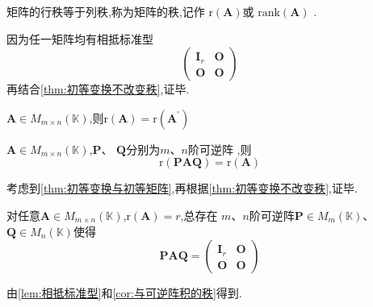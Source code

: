 \begin{formal}
\begin{theorem}[行列秩关系]
    矩阵的行秩等于列秩,称为矩阵的秩,记作
    $\mathrm{r}\left(\bm{A}\right)$或
    $\mathrm{rank}\left(\bm{A}\right)$
    .
\end{theorem}
\begin{Proof}
因为任一矩阵均有相抵标准型
\[
\begin{pmatrix}
    \bm{I}_r & \bm{O} \\
    \bm{O} & \bm{O} 
\end{pmatrix}
\]再结合\cref{thm:初等变换不改变秩},证毕.
\end{Proof}
\end{formal}
\begin{green}
\begin{corollary}[转置的秩]\label{cor:转置的秩}
    $\bm{A} \in 
    M_{m \times n}\left(
        \mathbb{K}
    \right)$,则$\mathrm{r}\left(
        \bm{A}\right) = \mathrm{r}
        \left(\bm{A}^{\prime}\right)$
\end{corollary}
\end{green}
\begin{green}
\begin{corollary}[与可逆阵积的秩]\label{cor:与可逆阵积的秩}
    $\bm{A} \in 
    M_{m \times n}\left(
        \mathbb{K}
    \right)$,$\bm{P}$、
    $\bm{Q}$分别为$m$、$n$阶可逆阵
    ,则\[
    \mathrm{r}\left(\bm{PAQ}
    \right) = \mathrm{r}\left(
        \bm{A}
    \right)
    \]
\end{corollary}
考虑到\cref{thm:初等变换与初等矩阵},再根据\cref{thm:初等变换不改变秩},证毕.
\end{green}
\begin{green}
    \begin{corollary}[相抵标准型]\label{cor:相抵标准型}
    对任意$\bm{A} \in 
    M_{m \times n}\left(
        \mathbb{K}
    \right)$,$\mathrm{r}\left(\bm{A}
    \right)= r$,总存在
    $m$、$n$阶可逆阵$\bm{P}
    \in M_m\left(\mathbb{K
    }\right)$、
    $\bm{Q}\in
    M_n\left(
        \mathbb{K}
    \right)$使得
    \[
    \bm{PAQ} = \begin{pmatrix}
        \bm{I}_r & \bm{O} \\
        \bm{O} & \bm{O}
    \end{pmatrix}
    \]
\end{corollary}
\begin{Proof}
由\cref{lem:相抵标准型}和\cref{cor:与可逆阵积的秩}得到.
\end{Proof}
\end{green}
